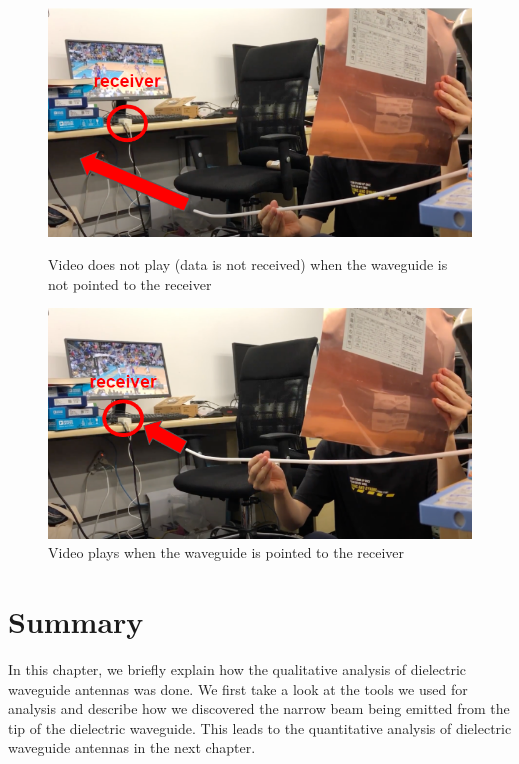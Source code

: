 \documentclass[a4paper,12pt]{report}
\begin{document}
\begin{figure}
  \centering
  \begin{minipage}{0.45\textwidth}
    \centering
    \includegraphics[clip, keepaspectratio, width=0.9\linewidth]{img/qualitative_waveguide_not_pointed.png}
    \caption{Video does not play (data is not received) when the waveguide is not pointed to the receiver}
    \label{img:qualitative_waveguide_not_pointed}
  \end{minipage}\hfill
  \begin{minipage}{0.45\textwidth}
    \centering
    \includegraphics[clip, keepaspectratio, width=0.9\linewidth]{img/qualitative_waveguide_pointed.png}
    \caption{Video plays when the waveguide is pointed to the receiver}
    \label{img:qualitative_waveguide_pointed}
  \end{minipage}\hfill
\end{figure}


\section{Summary}

In this chapter,
we briefly explain how the
qualitative analysis of dielectric waveguide antennas
was done.
We first take a look at the tools we used for analysis and describe how we
discovered the narrow beam being emitted
from the tip of the dielectric waveguide.
This leads to the quantitative analysis of
dielectric waveguide antennas in the next chapter.
\end{document}
